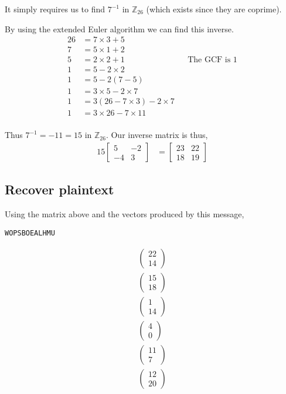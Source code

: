\documentclass{article}
\begin{document}
It simply requires us to find $7^{-1}$ in $\mathbb{Z}_{26}$ (which exists since
they are coprime).

By using the extended Euler algorithm we can find this inverse.
\begin{align*}
    26 &= 7\times3 + 5 \\
    7 &= 5\times1 + 2 \\
    5 &= 2\times2 + 1 && \text{The GCF is 1} \\
    1 &= 5 - 2\times2 \\
    1 &= 5 - 2(7-5) \\
    1 &= 3\times5 - 2\times7 \\
    1 &= 3(26 - 7\times3) - 2\times7 \\
    1 &= 3\times26 - 7\times11 \\
\end{align*}

Thus $7^{-1} = -11 = 15$ in $\mathbb{Z}_{26}$. Our inverse matrix is thus,
\begin{align*}
    15
    \begin{bmatrix}
        5 & -2 \\
        -4 & 3
    \end{bmatrix}
    &=
    \begin{bmatrix}
        23 & 22 \\
        18 & 19
    \end{bmatrix}
\end{align*}

\subsection{Recover plaintext}
Using the matrix above and the vectors produced by this message,
\begin{verbatim}
WOPSBOEALHMU
\end{verbatim}
\begin{align*}
    \begin{pmatrix}
        22 \\ 14
    \end{pmatrix} \\
    \begin{pmatrix}
        15 \\ 18
    \end{pmatrix} \\
    \begin{pmatrix}
        1 \\ 14
    \end{pmatrix} \\
    \begin{pmatrix}
        4 \\ 0
    \end{pmatrix} \\
    \begin{pmatrix}
        11 \\ 7
    \end{pmatrix} \\
    \begin{pmatrix}
        12 \\ 20
    \end{pmatrix} \\
\end{align*}
\end{document}
